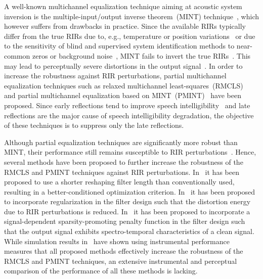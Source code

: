 \documentclass[fleqn]{aes2e}
\begin{document}
A well-known multichannel equalization technique aiming at acoustic system inversion is the multiple-input/output inverse theorem~(MINT) technique~\cite{Miyoshi_ITASS_1988}, which however suffers from drawbacks in practice. 
Since the available RIRs typically differ from the true RIRs due to, e.g., temperature or position variations~\cite{Elko03roomimpulse,cole1997position,Radlovic_ITSA_2000} or due to the sensitivity of blind and supervised system identification methods to near-common zeros or background noise~\cite{Haque_SPL_2008,Lin_ITASLP_2012,Lim_IWAENC_2014,Lim_ITASLP_2014,Goetze_phdthesis}, MINT fails to invert the true RIRs~\cite{Hacihabibouglu_ITASLP_2012}.
This may lead to perceptually severe distortions in the output signal~\cite{Kodrasi_ITASLP_2013,Lim_ITASLP_2014}.
In order to increase the robustness against RIR perturbations, partial multichannel equalization techniques such as relaxed multichannel least-squares~(RMCLS)~\cite{Lim_ITASLP_2014} and partial multichannel equalization based on MINT~(PMINT)~\cite{Kodrasi_ITASLP_2013} have been proposed. 
Since early reflections tend to improve speech intelligibility~\cite{Arweiler_JASA_2011} and late reflections are the major cause of speech intelligibility degradation, the objective of these techniques is to suppress only the late reflections.

Although partial equalization techniques are significantly more robust than MINT, their performance still remains susceptible to RIR perturbations~\cite{Kodrasi_ITASLP_2013}.
Hence, several methods have been proposed to further increase the robustness of the RMCLS and PMINT techniques against RIR perturbations.
In~\cite{Kodrasi_EUSIPCO_2012} it has been proposed to use a shorter reshaping filter length than conventionally used, resulting in a better-conditioned optimization criterion. 
In~\cite{Kodrasi_ITASLP_2013} it has been proposed to incorporate regularization in the filter design such that the distortion energy due to RIR perturbations is reduced. 
In~\cite{Kodrasi_ICASSP_2016,Kodrasi_ITASLP_2016b} it has been proposed to incorporate a signal-dependent sparsity-promoting penalty function in the filter design such that the output signal exhibits spectro-temporal characteristics of a clean signal.
While simulation results in~\cite{Kodrasi_EUSIPCO_2012, Kodrasi_ITASLP_2013,Kodrasi_ICASSP_2016, Kodrasi_ITASLP_2016b} have shown using instrumental performance measures that all proposed methods effectively increase the robustness of the RMCLS and PMINT techniques, an extensive instrumental and perceptual comparison of the performance of all these methods is lacking.
\end{document}
